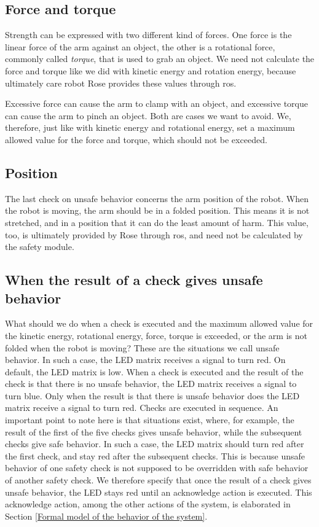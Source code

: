 \documentclass[12pt]{scrreprt}
\begin{document}
\subsection{Force and torque}
Strength can be expressed with two different kind of forces. One force is the linear force of the arm against an object, the other is a rotational force, commonly called \textit{torque}, that is used to grab an object. We need not calculate the force and torque like we did with kinetic energy and rotation energy, because ultimately care robot Rose provides these values through \acrshort{ros}.
\par
Excessive force can cause the arm to clamp with an object, and excessive torque can cause the arm to pinch an object. Both are cases we want to avoid. We, therefore, just like with kinetic energy and rotational energy, set a maximum allowed value for the force and torque, which should not be exceeded.

\subsection{Position}
The last check on unsafe behavior concerns the arm position of the robot. When the robot is moving, the arm should be in a folded position. This means it is not stretched, and in a position that it can do the least amount of harm. This value, too, is ultimately provided by Rose through \acrshort{ros}, and need not be calculated by the safety module.

\subsection{When the result of a check gives unsafe behavior}
\label{When the result of a check gives unsafe behavior}
What should we do when a check is executed and the maximum allowed value for the kinetic energy, rotational energy, force, torque is exceeded, or the arm is not folded when the robot is moving? 
These are the situations we call unsafe behavior. In such a case, the LED matrix receives a signal to turn red. On default, the LED matrix is low. When a check is executed and the result of the check is that there is no unsafe behavior, the LED matrix receives a signal to turn blue. Only when the result is that there is unsafe behavior does the LED matrix receive a signal to turn red. Checks are executed in sequence. An important point to note here is that situations exist, where, for example, the result of the first of the five checks gives unsafe behavior, while the subsequent checks give safe behavior. In such a case, the LED matrix should turn red after the first check, and stay red after the subsequent checks. This is because unsafe behavior of one safety check is not supposed to be overridden with safe behavior of another safety check. We therefore specify that once the result of a check gives unsafe behavior, the LED stays red until an acknowledge action is executed. This acknowledge action, among the other actions of the system, is elaborated in Section \ref{Formal model of the behavior of the system}.
\end{document}
